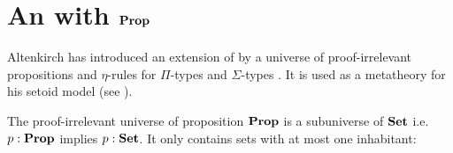











\section{An \itt with $\operatorname{\mathbf{Prop}}$}\label{ittprop}

Altenkirch has introduced an extension of \itt by a universe of proof-irrelevant propositions and $\eta$-rules for $\Pi$-types and $\Sigma$-types \cite{alti:lics99}. It is used as a metatheory for his setoid model (see ).

The proof-irrelevant universe of proposition $\operatorname{\mathbf{Prop}}$ is a subuniverse of  $\operatorname{\mathbf{Set}}$ i.e.\ $p : \operatorname{\mathbf{Prop}}$ implies $p : \operatorname{\mathbf{Set}}$. It only contains sets with at most one inhabitant:

